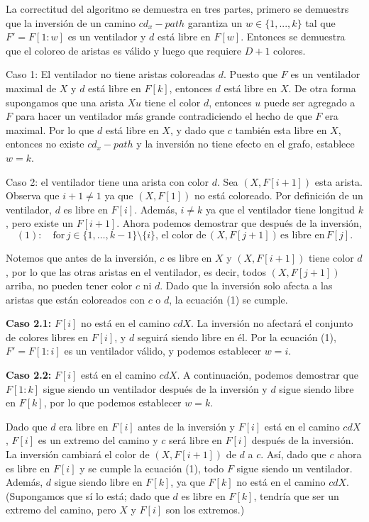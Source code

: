 \documentclass[a4paper]{article}
\begin{document}
La correctitud del algoritmo se demuestra en tres partes, primero se demuestrs que la inversi\'on de un camino $cd_x-path$ garantiza un $w \in \{1,...,k\}$ tal que $F' = F[1:w]$ es un ventilador y $d$ est\'a libre en $F[w]$. Entonces se demuestra que el coloreo de aristas es v\'alido y luego que requiere $D+1$ colores.

Caso 1: El ventilador no tiene aristas coloreadas $d$. Puesto que $F$ es un ventilador maximal de $X$ y $d$ est\'a libre en $F[k]$, entonces $d$ est\'a libre en $X$. De otra forma supongamos que una arista $Xu$ tiene el color $d$, entonces $u$ puede ser agregado a $F$ para hacer un ventilador m\'as grande contradiciendo el hecho de que $F$ era maximal. Por lo que $d$ est\'a libre en $X$, y dado que $c$ tambi\'en esta libre en $X$, entonces no existe $cd_x-path$ y la inversi\'on no tiene efecto en el grafo, establece $w = k$.

Caso 2: el ventilador tiene una arista con color \( d \). Sea \( (X, F[i+1]) \) esta arista. Observa que \( i+1 \neq 1 \) ya que \( (X, F[1]) \) no está coloreado. Por definición de un ventilador, \( d \) es libre en \( F[i] \). Además, \( i \neq k \) ya que el ventilador tiene longitud \( k \), pero existe un \( F[i+1] \). Ahora podemos demostrar que después de la inversión,
\[
(1): \quad \text{for} \, j \in \{1, \dots, k-1\} \setminus \{i\}, \, \text{el color de} \, (X, F[j+1]) \, \text{es libre en} \, F[j].
\]


Notemos que antes de la inversión, \( c \) es libre en \( X \) y \( (X, F[i+1]) \) tiene color \( d \), por lo que las otras aristas en el ventilador, es decir, todos \( (X, F[j+1]) \) arriba, no pueden tener color \( c \) ni \( d \). Dado que la inversión solo afecta a las aristas que están coloreados con \( c \) o \( d \), la ecuación (1) se cumple.

\textbf{Caso 2.1:} \( F[i] \) no está en el camino \( cdX \). La inversión no afectará el conjunto de colores libres en \( F[i] \), y \( d \) seguirá siendo libre en él. Por la ecuación (1), \( F' = F[1:i] \) es un ventilador válido, y podemos establecer \( w = i \).

\textbf{Caso 2.2:} \( F[i] \) está en el camino \( cdX \). A continuación, podemos demostrar que \( F[1:k] \) sigue siendo un ventilador después de la inversión y \( d \) sigue siendo libre en \( F[k] \), por lo que podemos establecer \( w = k \).

Dado que \( d \) era libre en \( F[i] \) antes de la inversión y \( F[i] \) está en el camino \( cdX \), \( F[i] \) es un extremo del camino y \( c \) será libre en \( F[i] \) después de la inversión. La inversión cambiará el color de \( (X, F[i+1]) \) de \( d \) a \( c \). Así, dado que \( c \) ahora es libre en \( F[i] \) y se cumple la ecuación (1), todo \( F \) sigue siendo un ventilador. Además, \( d \) sigue siendo libre en \( F[k] \), ya que \( F[k] \) no está en el camino \( cdX \). (Supongamos que sí lo está; dado que \( d \) es libre en \( F[k] \), tendría que ser un extremo del camino, pero \( X \) y \( F[i] \) son los extremos.)
\end{document}
